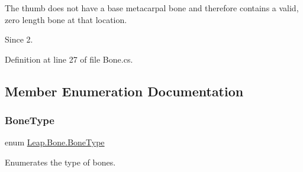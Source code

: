 The thumb does not have a base metacarpal bone and therefore contains a valid, zero length bone at that location. \begin{DoxySince}{Since}
2. 
\end{DoxySince}


Definition at line 27 of file Bone.\+cs.



\subsection{Member Enumeration Documentation}
\mbox{\label{class_leap_1_1_bone_a21054e31cefa7b75f25a026006fdbb1b}} 
\subsubsection{\texorpdfstring{BoneType}{BoneType}}
{\footnotesize\ttfamily enum \mbox{\hyperlink{class_leap_1_1_bone_a21054e31cefa7b75f25a026006fdbb1b}{Leap.\+Bone.\+Bone\+Type}}\hspace{0.3cm}{\ttfamily [strong]}}



Enumerates the type of bones. 


